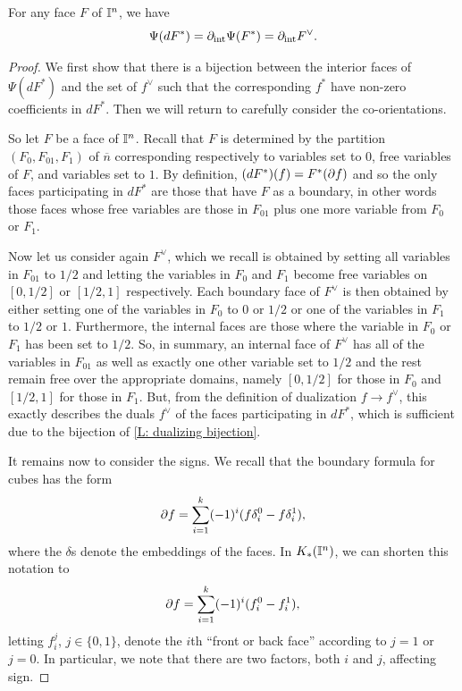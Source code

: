 \begin{lemma}\label{L: dualizing bijection}
For any face $F$ of $\mathbb{I}^n$, we have $$\Psi(d F^*) = \partial_{\text{int}}\Psi(F^*) = \partial_{\text{int}}F^\vee.$$
\end{lemma}
\begin{proof}
We first show that there is a bijection between the interior faces of $\Psi(d F^*)$ and the set of $f^\vee$ such that the corresponding $f^*$ have non-zero coefficients in $dF^*$. Then we will return to carefully consider the co-orientations.

So let $F$ be a face of $\mathbb{I}^n$. Recall that $F$ is determined by the partition $(F_0,F_{01}, F_1)$ of $\overline{n}$ corresponding respectively to variables set to $0$, free variables of $F$, and variables set to $1$. By definition, $(dF^*)(f) = F^*(\partial f)$ and so the only faces participating in $dF^*$ are those that have $F$ as a boundary, in other words those faces whose free variables are those in $F_{01}$ plus one more variable from $F_0$ or $F_1$.

Now let us consider again $F^\vee$, which we recall is obtained by setting all variables in $F_{01}$ to $1/2$ and letting the variables in $F_0$ and $F_1$ become free variables on $[0,1/2]$ or $[1/2,1]$ respectively. Each boundary face of $F^\vee$ is then obtained by either setting one of the variables in $F_0$ to $0$ or $1/2$ or one of the variables in $F_1$ to $1/2$ or $1$. Furthermore, the internal faces are those where the variable in $F_0$ or $F_1$ has been set to $1/2$. So, in summary, an internal face of $F^\vee$ has all of the variables in $F_{01}$ as well as exactly one other variable set to $1/2$ and the rest remain free over the appropriate domains, namely $[0,1/2]$ for those in $F_0$ and $[1/2,1]$ for those in $F_1$. But, from the definition of dualization $f \to f^\vee$, this exactly describes the duals $f^\vee$ of the faces participating in $dF^*$, which is sufficient due to the bijection of \cref{L: dualizing bijection}.

It remains now to consider the signs. We recall that the boundary formula for cubes has the form
$$\partial f = \sum_{i = 1}^k (-1)^i(f \delta_i^0-f \delta^1_i),$$ where the $\delta$s denote the embeddings of the faces. In $K_*(\mathbb{I}^n)$, we can shorten this notation to $$\partial f = \sum_{i = 1}^k (-1)^i(f_i^0-f^1_i),$$ letting $f_i^j$, $j \in \{0,1\}$, denote the $i$th ``front or back face'' according to $j = 1$ or $j = 0$. In particular, we note that there are two factors, both $i$ and $j$, affecting sign.


\end{proof}
